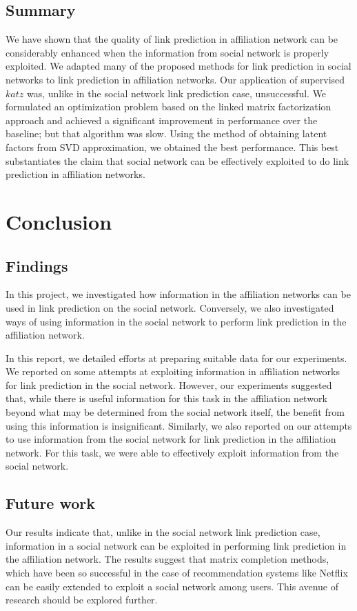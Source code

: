 \documentclass{report}
\begin{document}
\section{Summary}
We have shown that the quality of link prediction in affiliation network can be considerably enhanced when the information from social network is properly exploited. We adapted many of the proposed methods for link prediction in social networks to link prediction in affiliation networks. Our application of supervised $katz$ was, unlike in the social network link prediction case, unsuccessful. We formulated an optimization problem based on the linked matrix factorization approach and achieved a significant improvement in performance over the baseline; but that algorithm was slow. Using the method of obtaining latent factors from SVD approximation, we obtained the best performance. This best substantiates the claim that social network can be effectively exploited to do link prediction in affiliation networks.

\chapter{Conclusion}
\section{Findings}
In this project, we investigated how information in the affiliation networks can be used in link prediction on the social network. Conversely, we also investigated ways of using information in the social network to perform link prediction in the affiliation network.

In this report, we detailed efforts at preparing suitable data for our experiments. We reported on some attempts at exploiting information in affiliation networks for link prediction in the social network. However, our experiments suggested that, while there is useful information for this task in the affiliation network beyond what may be determined from the social network itself, the benefit from using this information is insignificant. Similarly, we also reported on our attempts to use information from the social network for link prediction in the affiliation network. For this task, we were able to effectively exploit information from the social network.

\section{Future work}
Our results indicate that, unlike in the social network link prediction case, information in a social network can be exploited in performing link prediction in the affiliation network. The results suggest that matrix completion methods, which have been so successful in the case of recommendation systems like Netflix can be easily extended to exploit a social network among users. This avenue of research should be explored further.
\end{document}
